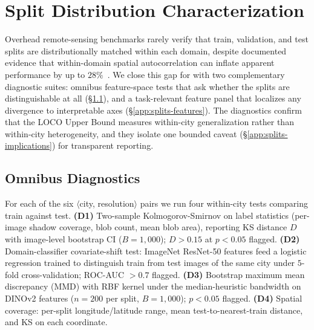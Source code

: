\section{Split Distribution Characterization}
\label{app:splits}

Overhead remote-sensing benchmarks rarely verify that train, validation, and test splits are distributionally matched within each domain, despite documented evidence that within-domain spatial autocorrelation can inflate apparent performance by up to $28\%$~\cite{kattenborn2022spatially}. We close this gap for \shadow{} with two complementary diagnostic suites: omnibus feature-space tests that ask whether the splits are distinguishable at all (\S\ref{app:splits-omnibus}), and a task-relevant feature panel that localizes any divergence to interpretable axes (\S\ref{app:splits-features}). The diagnostics confirm that the LOCO Upper Bound measures within-city generalization rather than within-city heterogeneity, and they isolate one bounded caveat (\S\ref{app:splits-implications}) for transparent reporting.

\subsection{Omnibus Diagnostics}
\label{app:splits-omnibus}

For each of the six $\langle$city, resolution$\rangle$ pairs we run four within-city tests comparing train against test. \textbf{(D1)} Two-sample Kolmogorov-Smirnov on label statistics (per-image shadow coverage, blob count, mean blob area), reporting KS distance $D$ with image-level bootstrap CI ($B{=}1{,}000$); $D > 0.15$ at $p < 0.05$ flagged. \textbf{(D2)} Domain-classifier covariate-shift test: ImageNet ResNet-50 features feed a logistic regression trained to distinguish train from test images of the same city under $5$-fold cross-validation; ROC-AUC $> 0.7$ flagged. \textbf{(D3)} Bootstrap maximum mean discrepancy (MMD) with RBF kernel under the median-heuristic bandwidth on DINOv2 features ($n = 200$ per split, $B = 1{,}000$); $p < 0.05$ flagged. \textbf{(D4)} Spatial coverage: per-split longitude/latitude range, mean test-to-nearest-train distance, and KS on each coordinate.

